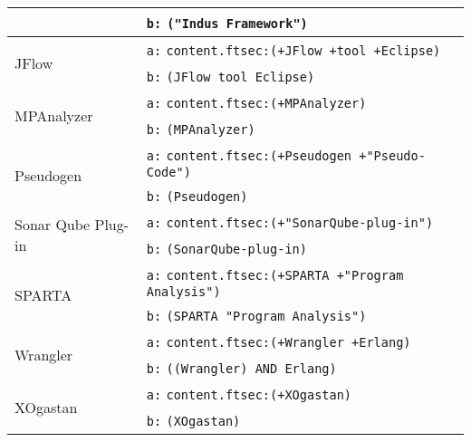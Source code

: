 \begin{table}[h]
\begin{tabular}{l p{10cm} c}
            & \texttt{b:} \texttt{("Indus Framework")} \\
  \hline
  \multirow{2}{*}{JFlow}
            & \texttt{a:} \texttt{content.ftsec:(+JFlow +tool +Eclipse)} \\
            & \texttt{b:} \texttt{(JFlow tool Eclipse)} \\
  \hline
  \multirow{2}{*}{MPAnalyzer}
            & \texttt{a:} \texttt{content.ftsec:(+MPAnalyzer)} \\
            & \texttt{b:} \texttt{(MPAnalyzer)} \\
  \hline
  \multirow{2}{*}{Pseudogen}
            & \texttt{a:} \texttt{content.ftsec:(+Pseudogen +"Pseudo-Code")} \\
            & \texttt{b:} \texttt{(Pseudogen)} \\
  \hline
  \multirow{2}{*}{Sonar Qube Plug-in}
            & \texttt{a:} \texttt{content.ftsec:(+"SonarQube-plug-in")} \\
            & \texttt{b:} \texttt{(SonarQube-plug-in)} \\
  \hline
  \multirow{2}{*}{SPARTA}
            & \texttt{a:} \texttt{content.ftsec:(+SPARTA +"Program Analysis")} \\
            & \texttt{b:} \texttt{(SPARTA "Program Analysis")} \\
  \hline
  \multirow{2}{*}{Wrangler}
            & \texttt{a:} \texttt{content.ftsec:(+Wrangler +Erlang)} \\
            & \texttt{b:} \texttt{((Wrangler) AND Erlang)} \\
  \hline
  \multirow{2}{*}{XOgastan}
            & \texttt{a:} \texttt{content.ftsec:(+XOgastan)} \\
            & \texttt{b:} \texttt{(XOgastan)} \\
  \hline
\end{tabular}
\label{search-string-table}
\end{table}

